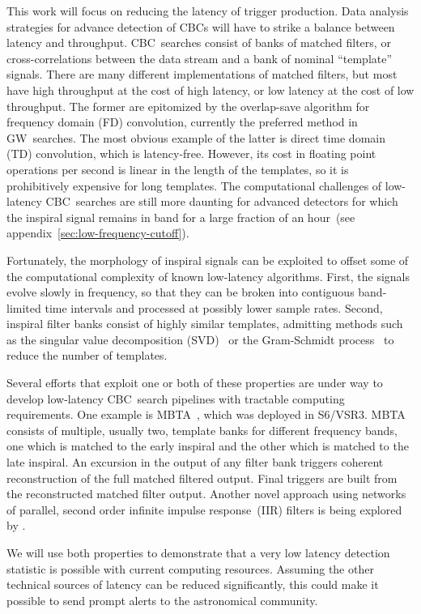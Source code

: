 \documentclass[preprint2]{aastex}
\newcommand{\mbta}{MBTA}
\newcommand{\GW}{GW}%
\newcommand{\CBC}{CBC}%
\newcommand{\SVD}{SVD}%
\newcommand{\TD}{TD}%
\newcommand{\FD}{FD}%
\begin{document}
This work will focus on reducing the latency of trigger production.  Data
analysis strategies for advance detection of \CBC{}s will have to strike a
balance between latency and throughput. \CBC\ searches consist of banks of
matched filters, or cross-correlations between the data stream and a bank of
nominal ``template'' signals.  There are many different implementations of
matched filters, but most have high throughput at the cost of high latency, or
low latency at the cost of low throughput.  The former are epitomized by the
overlap-save algorithm for frequency domain (\FD) convolution, currently the
preferred method in \GW\ searches.  The most obvious example of the latter is
direct time domain (\TD) convolution, which is latency-free.  However, its cost in floating
point operations per second is linear in the length of the templates, so it is
prohibitively expensive for long templates.  The computational challenges of low-latency \CBC\ searches are still more daunting for advanced detectors for which the inspiral signal remains in band for a large fraction of an hour~(see appendix~\ref{sec:low-frequency-cutoff}).

Fortunately, the morphology of inspiral signals can be exploited to offset some
of the computational complexity of known low-latency algorithms.  First, the signals
evolve slowly in frequency, so that they can be broken into contiguous
band-limited time intervals and processed at possibly lower sample rates.
Second, inspiral filter banks consist of highly similar templates, admitting
methods such as the singular value decomposition (\SVD)~\citep{Cannon:2010p10398}
or the Gram-Schmidt process~\citep{rbf} to reduce the number of templates.

Several efforts that exploit one or both of these properties are under way to
develop low-latency \CBC\ search pipelines with tractable computing requirements.
One example is \mbta{}~\citep{Marion2004, Buskulic2010}, which was deployed in
S6/VSR3.  MBTA consists of multiple, usually two, template banks for different frequency bands, one which is matched to the early inspiral and the other which is matched to the late inspiral.  An excursion in the output of any filter bank triggers coherent reconstruction of the full matched filtered output.  Final triggers are built from the reconstructed matched filter output.  Another novel approach using networks of parallel, second order infinite impulse response~(IIR) filters is being explored
by \citet{shaunIIR, linqingIIR}.

We will use both properties to demonstrate that a very low latency detection statistic
is possible with current computing resources.  Assuming the other technical
sources of latency can be reduced significantly, this could make it possible to
send prompt alerts to the astronomical community.
\end{document}
